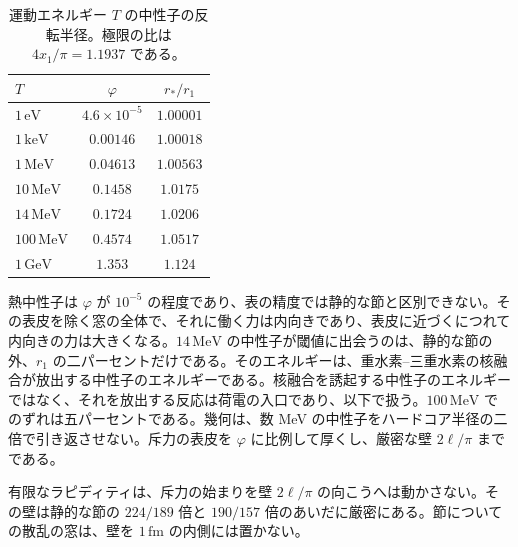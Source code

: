 \documentclass[a4paper]{article}
\begin{document}
\begin{table}[htbp]
\centering
\caption{運動エネルギー \(T\) の中性子の反転半径。極限の比は \(4x_1/\pi=1.1937\) である。}
\label{tab:neutron}
\begin{tabular}{lcc}
\hline
\(T\) & \(\varphi\) & \(r_*/r_1\) \\
\hline
\(1\,\mathrm{eV}\) & \(4.6\times 10^{-5}\) & \(1.00001\) \\
\(1\,\mathrm{keV}\) & \(0.00146\) & \(1.00018\) \\
\(1\,\mathrm{MeV}\) & \(0.04613\) & \(1.00563\) \\
\(10\,\mathrm{MeV}\) & \(0.1458\) & \(1.0175\) \\
\(14\,\mathrm{MeV}\) & \(0.1724\) & \(1.0206\) \\
\(100\,\mathrm{MeV}\) & \(0.4574\) & \(1.0517\) \\
\(1\,\mathrm{GeV}\) & \(1.353\) & \(1.124\) \\
\hline
\end{tabular}
\end{table}

熱中性子は \(\varphi\) が \(10^{-5}\) の程度であり、表の精度では静的な節と区別できない。その表皮を除く窓の全体で、それに働く力は内向きであり、表皮に近づくにつれて内向きの力は大きくなる。\(14\,\mathrm{MeV}\) の中性子が閾値に出会うのは、静的な節の外、\(r_1\) の二パーセントだけである。そのエネルギーは、重水素--三重水素の核融合が放出する中性子のエネルギーである。核融合を誘起する中性子のエネルギーではなく、それを放出する反応は荷電の入口であり、以下で扱う。\(100\,\mathrm{MeV}\) でのずれは五パーセントである。幾何は、数 MeV の中性子をハードコア半径の二倍で引き返させない。斥力の表皮を \(\varphi\) に比例して厚くし、厳密な壁 \(2\ell/\pi\) までである。

有限なラピディティは、斥力の始まりを壁 \(2\ell/\pi\) の向こうへは動かさない。その壁は静的な節の \(224/189\) 倍と \(190/157\) 倍のあいだに厳密にある。節についての散乱の窓は、壁を \(1\,\mathrm{fm}\) の内側には置かない。
\end{document}
